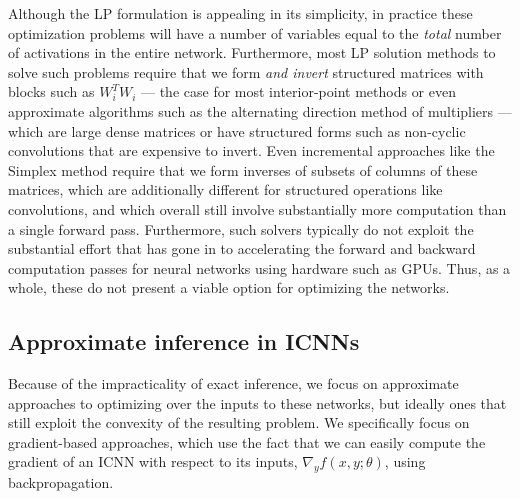 Although the LP formulation is appealing in its simplicity, in practice these
optimization problems will have a number of variables equal to the \emph{total}
number of activations in the entire network.  Furthermore, most LP solution
methods to solve such problems require that we form \emph{and invert}
structured matrices with blocks such as $W_i^T W_i$
--- the case for most interior-point methods \citep{wright1997primal} or
even approximate algorithms such as the
alternating direction method of multipliers \citep{boyd2011distributed} ---
which are large dense matrices or have structured forms such as
non-cyclic convolutions that are expensive to invert.
Even incremental approaches like the Simplex method
require that we form inverses of subsets of columns of these matrices, which are
additionally different for structured operations like convolutions, and which
overall still involve substantially more computation than a single forward pass.
Furthermore, such solvers typically do not exploit the substantial effort that
has gone in to accelerating the forward and backward computation passes for
neural networks using hardware such as GPUs.  Thus, as a whole, these do not
present a viable option for optimizing the networks.


\subsection{Approximate inference in ICNNs}
Because of the impracticality of exact inference, we focus on approximate
approaches to optimizing over the inputs to these networks, but ideally ones
that still exploit the convexity of the resulting problem.  We
specifically focus on gradient-based approaches, which use the fact that we can
easily compute the gradient of an ICNN with respect to its inputs, $\nabla_y f
(x,y;\theta)$, using backpropagation.

